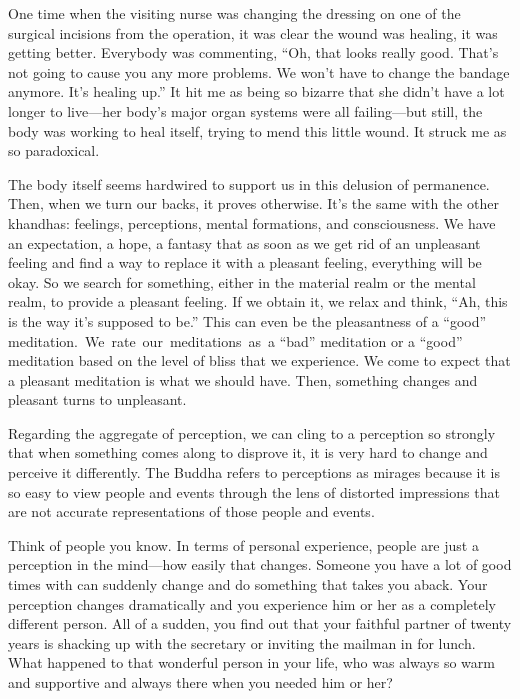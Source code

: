 One time when the visiting nurse was changing the dressing on one of the surgical incisions from the operation, it was clear the wound was healing, it was getting better. Everybody was commenting, ``Oh, that looks really good. That's not going to cause you any more problems. We won't have to change the bandage anymore. It's healing up.'' It hit me as being so bizarre that she didn't have a lot longer to live---her body's major organ systems were all failing---but still, the body was working to heal itself, trying to mend this little wound. It struck me as so paradoxical.

The body itself seems hardwired to support us in this delusion of permanence. Then, when we turn our backs, it proves otherwise. It's the same with the other khandhas: feelings, perceptions, mental formations, and consciousness. We have an expectation, a hope, a fantasy that as soon as we get rid of an unpleasant feeling and find a way to replace it with a pleasant feeling, everything will be okay. So we search for something, either in the material realm or the mental realm, to provide a pleasant feeling. If we obtain it, we relax and think, ``Ah, this is the way it's supposed to be.'' This can even be the pleasantness of a ``good'' \mbox{meditation. We rate our meditations as a} ``bad'' meditation or a ``good'' meditation based on the level of bliss that we experience. We come to expect that a pleasant meditation is what we should have. Then, something changes and pleasant turns to unpleasant.

Regarding the aggregate of perception, we can cling to a perception so strongly that when something comes along to disprove it, it is very hard to change and perceive it differently. The Buddha refers to perceptions as mirages because it is so easy to view people and events through the lens of distorted impressions that are not accurate representations of those people and events.

Think of people you know. In terms of personal experience, people are just a perception in the mind---how easily that changes. Someone you have a lot of good times with can suddenly change and do something that takes you aback. Your perception changes dramatically and you experience him or her as a completely different person. All of a sudden, you find out that your faithful partner of twenty years is shacking up with the secretary or inviting the mailman in for lunch. What happened to that wonderful person in your life, who was always so warm and supportive and always there when you needed him or her?

